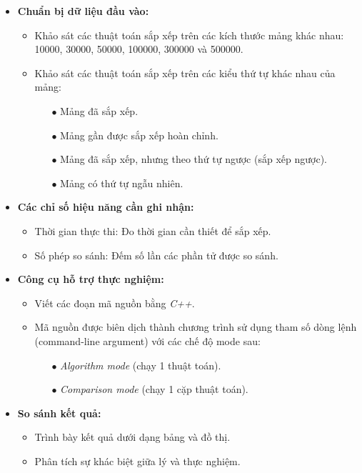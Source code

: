 \begin{itemize}
    \item \textbf{Chuẩn bị dữ liệu đầu vào:}
    \begin{itemize}
    \item Khảo sát các thuật toán sắp xếp trên các kích thước mảng khác nhau: 10000, 30000, 50000, 100000, 300000 và 500000.
    \item Khảo sát các thuật toán sắp xếp trên các kiểu thứ tự khác nhau của mảng:
        \begin{itemize}
            \item[$\bullet$] Mảng đã sắp xếp.
            \item[$\bullet$] Mảng gần được sắp xếp hoàn chỉnh.
            \item[$\bullet$] Mảng đã sắp xếp, nhưng theo thứ tự ngược (sắp xếp ngược).
            \item[$\bullet$] Mảng có thứ tự ngẫu nhiên.
        \end{itemize}
    \end{itemize}
    \item \textbf{Các chỉ số hiệu năng cần ghi nhận:}
    \begin{itemize}
        \item Thời gian thực thi: Đo thời gian cần thiết để sắp xếp.
        \item Số phép so sánh: Đếm số lần các phần tử được so sánh.
    \end{itemize}
    \item \textbf{Công cụ hỗ trợ thực nghiệm:}
    \begin{itemize}
        \item Viết các đoạn mã nguồn bằng \textit{C++}.
        \item Mã nguồn được biên dịch thành chương trình sử dụng tham số dòng lệnh (command-line argument) với các chế độ mode sau:
        \begin{itemize}
            \item[$\bullet$] \textit{Algorithm mode} (chạy 1 thuật toán).
            \item[$\bullet$] \textit{Comparison mode} (chạy 1 cặp thuật toán).
        \end{itemize}
    \end{itemize}
    \item \textbf{So sánh kết quả:}
    \begin{itemize}
        \item Trình bày kết quả dưới dạng bảng và đồ thị.
        \item Phân tích sự khác biệt giữa lý và thực nghiệm.
    \end{itemize}
\end{itemize}

